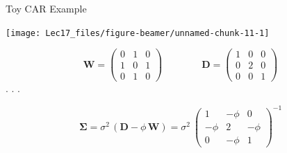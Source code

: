 \documentclass[11pt,ignorenonframetext,]{beamer}
\begin{document}
\begin{frame}[t]{Toy CAR Example}
\protect\hypertarget{toy-car-example}{}

\begin{center}\texttt{[image: Lec17\_files/figure-beamer/unnamed-chunk-11-1]} \end{center}

\pause

\[
\symbf{W} = \begin{pmatrix}
0 & 1 & 0 \\
1 & 0 & 1 \\
0 & 1 & 0 
\end{pmatrix}
\qquad\qquad
\symbf{D} = \begin{pmatrix}
1 & 0 & 0 \\
0 & 2 & 0 \\
0 & 0 & 1 
\end{pmatrix}
\] . . .

\[
\symbf{\Sigma} = \sigma^2 \, (\symbf{D} - \phi \, \symbf{W}) = \sigma^2~\begin{pmatrix}
1 & -\phi & 0 \\
-\phi & 2 & -\phi \\
0 & -\phi & 1 
\end{pmatrix}^{-1}
\]

\end{frame}
\end{document}
